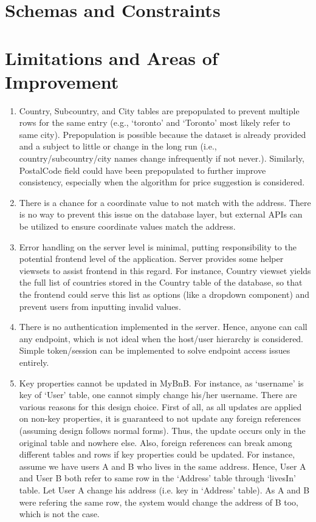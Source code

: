 \documentclass[11pt]{article}
\begin{document}
\section*{Schemas and Constraints}

\section*{Limitations and Areas of Improvement}

\begin{enumerate}
  \item Country, Subcountry, and City tables are prepopulated to prevent multiple rows
  for the same entry (e.g., `toronto' and `Toronto' most likely refer to same city).
  Prepopulation is possible because the dataset is already provided and a subject to
  little or change in the long run (i.e., country/subcountry/city names change infrequently
  if not never.). Similarly, PostalCode field could have been prepopulated to further
  improve consistency, especially when the algorithm for price suggestion is considered.

  \item There is a chance for a coordinate value to not match with the address. There is no
  way to prevent this issue on the database layer, but external APIs can be utilized to ensure
  coordinate values match the address.

  \item Error handling on the server level is minimal, putting responsibility to the
  potential frontend level of the application. Server provides some helper viewsets
  to assist frontend in this regard. For instance, Country viewset yields the full list
  of countries stored in the Country table of the database, so that the frontend could
  serve this list as options (like a dropdown component) and prevent users from inputting
  invalid values.

  \item There is no authentication implemented in the server. Hence, anyone can call any
  endpoint, which is not ideal when the host/user hierarchy is considered. Simple token/session
  can be implemented to solve endpoint access issues entirely.

  \item Key properties cannot be updated in MyBnB. For instance, as `username' is key
  of `User' table, one cannot simply change his/her username. There are various reasons for this
  design choice. First of all, as all updates are applied on non-key properties, it is guaranteed
  to not update any foreign references (assuming design follows normal forms). Thus, the update
  occurs only in the original table and nowhere else. Also, foreign references can break among
  different tables and rows if key properties could be updated. For instance, assume we have users
  A and B who lives in the same address. Hence, User A and User B both refer to same row in the
  `Address' table through `livesIn' table. Let User A change his address (i.e. key in `Address' table).
  As A and B were refering the same row, the system would change the address of B too, which
  is not the case.
\end{enumerate}
\end{document}
